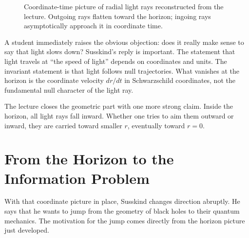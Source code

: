 \begin{figure}[h]
\centering
{}
\caption{Coordinate-time picture of radial light rays reconstructed from the lecture. Outgoing rays flatten toward the horizon; ingoing rays asymptotically approach it in coordinate time.}
\end{figure}

A student immediately raises the obvious objection: does it really make sense to say that light slows down? Susskind's reply is important. The statement that light travels at ``the speed of light'' depends on coordinates and units. The invariant statement is that light follows null trajectories. What vanishes at the horizon is the coordinate velocity \(dr/dt\) in Schwarzschild coordinates, not the fundamental null character of the light ray.

The lecture closes the geometric part with one more strong claim. Inside the horizon, all light rays fall inward. Whether one tries to aim them outward or inward, they are carried toward smaller \(r\), eventually toward \(r=0\).

\section{From the Horizon to the Information Problem}

With that coordinate picture in place, Susskind changes direction abruptly. He says that he wants to jump from the geometry of black holes to their quantum mechanics. The motivation for the jump comes directly from the horizon picture just developed.

